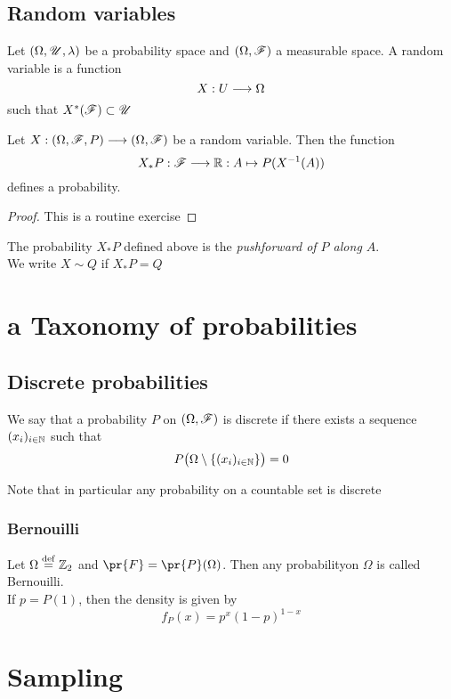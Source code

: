 \subsection{Random variables}
\begin{definition}
Let $(\Omega, \r{U}, \lambda)$ be a probability space and $(\Omega, \r{F})$ a measurable space. A random variable is a function
\[
X: U\longrightarrow \Omega
\]
such that $X^*(\r{F})\subset \r{U}$
\end{definition}
\begin{lemma}
Let $X: (\Omega, \r{F}, P)\mor (\Omega, \r{F})$ be a random variable. Then the function
\[
X_*P: \r{F}\mor \d{R}:  A\fun P(X^{-1}(A)) 
\]
defines a probability.
\end{lemma}
\begin{proof}
This is a routine exercise
\end{proof}
\begin{definition}
The probability $X_*P$ defined above is the \emph{pushforward of $P$ along $A$}.\\
We write $X\sim Q$ if $X_*P =Q$
\end{definition}
\section{a Taxonomy of probabilities}
\subsection{Discrete probabilities}
\begin{definition}
We say that a probability $P$ on $(\Omega,\r{F})$ is discrete if there exists a sequence $(x_i)_{i \in \mathbb{N}}$ such that
\[
P\big(\Omega\setminus\{(x_i)_{i \in \mathbb{N}}\}\big)=0
\]
\end{definition}
Note that in particular any probability on a countable set is discrete
\subsubsection{Bernouilli}
\begin{definition}
Let $\Omega\stackrel{\operatorname{def}}{=} \mathbb{Z}_2$ and $\pr{F}=\pr{P}(\Omega)$. Then any probabilityon $\Omega$ is called Bernouilli.\\
If $p=P(1)$, then the density is given by
\[
f_P(x) = p^x(1-p)^{1-x}
\]
\end{definition}

\section{Sampling}

